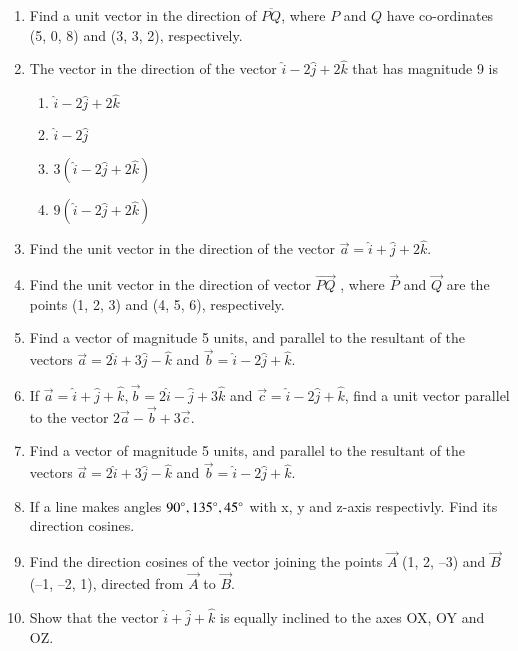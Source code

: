 \begin{enumerate}[label=\thesubsection.\arabic*, ref=\thesubsection.\theenumi]
\item Find a unit vector in the direction of $\overline{PQ} $,  where $P$ and $Q$ have co-ordinates (5, 0, 8) and (3, 3, 2), respectively.
\item The vector in the direction of the vector $\hat{i}-2\hat{j}+2\hat{k}$ that has magnitude 9 is
	\begin{enumerate}
\item $\hat{i}-2\hat{j}+2\hat{k}$
\item $\hat{i}-2\hat{j}$
\item $3(\hat{i}-2\hat{j}+2\hat{k})$
\item $9(\hat{i}-2\hat{j}+2\hat{k})$
\end{enumerate}
\item Find the unit vector in the direction of the vector $\vec{a}=\hat{i}+\hat{j}+2\hat{k}$.
\item Find the unit vector in the direction of vector $\overrightarrow{PQ}$ ,  where $\vec{P}$ and $\vec{Q}$ are the points
(1,  2,  3) and (4,  5,  6),  respectively.
\item Find a vector of magnitude 5 units,  and parallel to the resultant of the vectors $\vec{a}=2\hat{i}+3\hat{j}-\hat{k}$ and $\vec{b}=\hat{i}-2\hat{j}+\hat{k}$.\\
\item If $\vec{a}=\hat{i}+\hat{j}+\hat{k},  \vec{b}=2\hat{i}-\hat{j}+3\hat{k}$ and $\vec{c}=\hat{i}-2\hat{j}+\hat{k}$,  find a unit vector parallel to the vector $2\vec{a}-\vec{b}+3\vec{c}$.\\
	\solution
		
	\item 
Find a vector of magnitude 5 units,  and parallel to the resultant of the vectors $\vec{a} = 2\hat{i}+3\hat{j}-\hat{k}$ and $\vec{b} = \hat{i}-2\hat{j}+\hat{k}$.
\\
\solution
		
	\item If a line makes angles $90\degree, 135\degree, 45\degree$ with x, y and z-axis respectivly. Find its direction cosines.
		\\
		\solution
		
\item Find the direction cosines of the vector joining the points $\vec{A}$ (1,  2,  –3) and
$\vec{B}$(–1,  –2,  1),  directed from $\vec{A}$ to $\vec{B}$.
	\\
    \solution 
		
\item Show that the vector $\hat{i}+\hat{j}+\hat{k}$ is equally inclined to the axes OX,  OY and OZ.

\end{enumerate}
